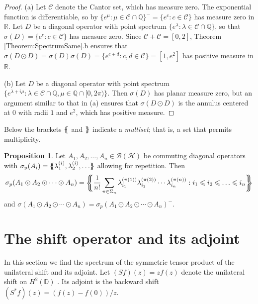 \documentclass[10pt,reqno]{amsart}
\newcommand{\0}{{\color{lightgray}0}}
\newcommand{\D}{\mathbb{D}}
\newcommand{\R}{\mathbb{R}}
\newcommand{\Q}{\mathbb{Q}}
\newcommand{\CC}{\mathscr{C}}
\renewcommand{\leq}{\leqslant}
\newcommand{\h}{\mathcal{H}}
\theoremstyle{definition}
\newtheorem{Proposition}[equation]{Proposition}
\numberwithin{equation}{section}
\begin{document}
\begin{proof}
\noindent(a) Let $\CC$ denote the Cantor set, which has measure zero. The exponential function is differentiable, so by \cite[Lemma 7.25]{RudinRCA}
$\{ e^\mu : \mu \in \CC\cap \Q \}^- = \{e^c : c \in \CC\}$ has measure zero in $\R$.
Let $D$ be a diagonal operator with point spectrum $\{ e^{\lambda} : \lambda \in \CC \cap \Q\}$,
so that $\sigma(D) = \{e^c : c \in \mathscr{C}\}$ has measure zero.  
Since $\mathscr{C}+\mathscr{C}=[0,2]$,
Theorem \ref{Theorem:SpectrumSame}.b ensures that
$\sigma(D \odot D) = \sigma(D)\sigma(D) =  \{ e^{c+d} : c,d \in \mathscr{C}\} = [1,e^2]$
has positive measure in $\R$.

\medskip\noindent(b) Let $D$ be a diagonal operator with point spectrum
$\{ e^{\lambda + i \mu} : \lambda \in \CC \cap \Q, \mu \in \Q \cap [0,2\pi)\}$.
Then $\sigma(D)$ has planar measure zero, but an argument similar to that in (a)
ensures that $\sigma(D\odot D)$ is the annulus centered 
at $0$ with radii $1$ and $e^2$, which has positive measure.
\end{proof} 

Below the brackets $\{\hspace{-3.5pt}\{$ and $\}\hspace{-3.5pt}\}$ indicate a \emph{multiset};
that is, a set that permits multiplicity.

\begin{Proposition}\label{Proposition:MultiDiagSpec}
Let $A_1, A_2,  \ldots, A_n \in \mathcal{B} (\h)$ be commuting diagonal operators with
$\sigma_{\textrm{p}}(A_i) = \{\hspace{-3.5pt}\{ \lambda_1^{(i)}, \lambda_2^{(i)},\ldots \}\hspace{-3.5pt}\}$ allowing for repetition. Then
\begin{equation*}\small
\sigma_p(A_1 \odot A_2 \odot \cdots \odot A_n) 
=  \bigg\{\!\!\!\bigg\{\frac{1}{n!} \sum_{\pi \in \Sigma_n }\lambda_{i_1}^{(\pi(1))} \lambda_{i_2}^{(\pi(2))}\cdots \lambda_{i_n}^{(\pi(n))}  : 
 i_1 \leq i_2 \leq \ldots \leq i_n   \bigg\}\!\!\!\bigg\}
\end{equation*}
and $\sigma(A_1 \odot A_2 \odot \cdots \odot A_n) = \sigma_p(A_1 \odot A_2 \odot \cdots \odot A_n)^-$.
\end{Proposition}


\section{The shift operator and its adjoint}\label{Chapter:ShiftAndAdjoint}
In this section we find the spectrum of the symmetric tensor product of the unilateral shift and its adjoint.
Let $(Sf)(z) = zf(z)$ denote the unilateral shift on $H^2(\D)$ \cite[Ch.~5]{OTBE}.
Its adjoint is the backward shift $(S^*f)(z) = (f(z)-f(0))/z$.  
\end{document}
